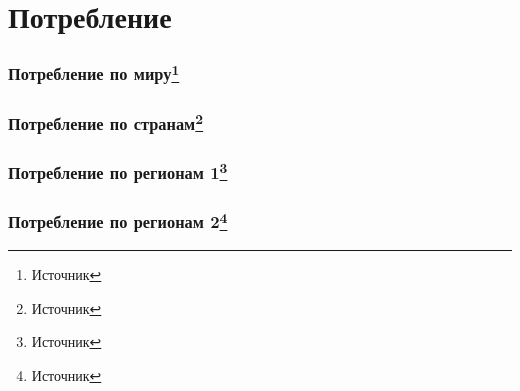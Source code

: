 \section{Потребление}

\begin{frame}
    \frametitle{Потребление по миру\footnote{Источник}}
    \begin{center}
        
    \end{center}
\end{frame}

\begin{frame}
    \frametitle{Потребление по странам\footnote{Источник}}
    \begin{center}
        
    \end{center}
\end{frame}

\begin{frame}
    \frametitle{Потребление по регионам 1\footnote{Источник}}
    \begin{center}
        
    \end{center}
\end{frame}

\begin{frame}
    \frametitle{Потребление по регионам 2\footnote{Источник}}
    \begin{center}
        
    \end{center}
\end{frame}
